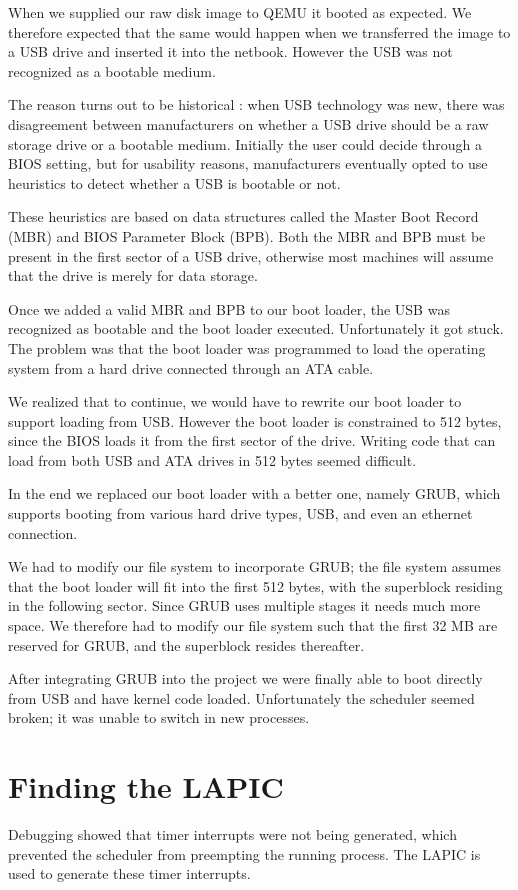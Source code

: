 \documentclass{report}
\begin{document}
When we supplied our raw disk image to QEMU it booted as expected. We
therefore expected that the same would happen when we transferred the image to
a USB drive and inserted it into the netbook. However the USB was not
recognized as a bootable medium. 

The reason turns out to be historical \cite{bootingfromusb}: when USB
technology was new, there was disagreement between manufacturers on whether a
USB drive should be a raw storage drive or a bootable medium. Initially the
user could decide through a BIOS setting, but for usability reasons,
manufacturers eventually opted to use heuristics to detect whether a USB is
bootable or not. 

These heuristics are based on data structures called the Master Boot Record
(MBR) and BIOS Parameter Block (BPB). Both the MBR and BPB must be present in
the first sector of a USB drive, otherwise most machines will assume that the
drive is merely for data storage. 

Once we added a valid MBR and BPB to our boot loader, the USB was recognized
as bootable and the boot loader executed. Unfortunately it got stuck. The
problem was that the boot loader was programmed to load the operating system
from a hard drive connected through an ATA cable.

We realized that to continue, we would have to rewrite our boot loader to
support loading from USB. However the boot loader is constrained to 512 bytes,
since the BIOS loads it from the first sector of the drive. Writing code that
can load from both USB and ATA drives in 512 bytes seemed difficult.

In the end we replaced our boot loader with a better one, namely GRUB, which
supports booting from various hard drive types, USB, and even an ethernet
connection. 

We had to modify our file system to incorporate GRUB; the file system assumes
that the boot loader will fit into the first 512 bytes, with the superblock
residing in the following sector. Since GRUB uses multiple stages it needs
much more space. We therefore had to modify our file system such that the
first 32 MB are reserved for GRUB, and the superblock resides thereafter.

After integrating GRUB into the project we were finally able to boot directly
from USB and have kernel code loaded. Unfortunately the scheduler seemed
broken; it was unable to switch in new processes.



\section{Finding the LAPIC}
Debugging showed that timer interrupts were not being generated, which
prevented the scheduler from preempting the running process. The LAPIC is
used to generate these timer interrupts.
\end{document}
